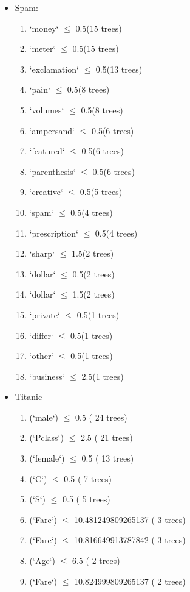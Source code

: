 \documentclass[8pt]{article}
\begin{document}
\begin{itemize}
\begin{itemize}
    \item Spam:
    \begin{enumerate}
        \item `money` $\le$ 0.5(15 trees)
        \item `meter` $\le$ 0.5(15 trees)
        \item `exclamation` $\le$ 0.5(13 trees)
        \item `pain` $\le$ 0.5(8 trees)
        \item `volumes` $\le$ 0.5(8 trees)
        \item `ampersand` $\le$ 0.5(6 trees)
        \item `featured` $\le$ 0.5(6 trees)
        \item `parenthesis` $\le$ 0.5(6 trees)
        \item `creative` $\le$ 0.5(5 trees)
        \item `spam` $\le$ 0.5(4 trees)
        \item `prescription` $\le$ 0.5(4 trees)
        \item `sharp` $\le$ 1.5(2 trees)
        \item `dollar` $\le$ 0.5(2 trees)
        \item `dollar` $\le$ 1.5(2 trees)
        \item `private` $\le$ 0.5(1 trees)
        \item `differ` $\le$ 0.5(1 trees)
        \item `other` $\le$ 0.5(1 trees)
        \item `business` $\le$ 2.5(1 trees)
    \end{enumerate}
    \item Titanic
    \begin{enumerate}
        \item (`male`) $\le$ 0.5 ( 24 trees)
        \item (`Pclass`) $\le$ 2.5 ( 21 trees)
        \item (`female`) $\le$ 0.5 ( 13 trees)
        \item (`C`) $\le$ 0.5 ( 7 trees)
        \item (`S`) $\le$ 0.5 ( 5 trees)
        \item (`Fare`) $\le$ 10.481249809265137 ( 3 trees)
        \item (`Fare`) $\le$ 10.816649913787842 ( 3 trees)
        \item (`Age`) $\le$ 6.5 ( 2 trees)
        \item (`Fare`) $\le$ 10.824999809265137 ( 2 trees)

\end{enumerate}
\end{itemize}
\end{itemize}
\end{document}
